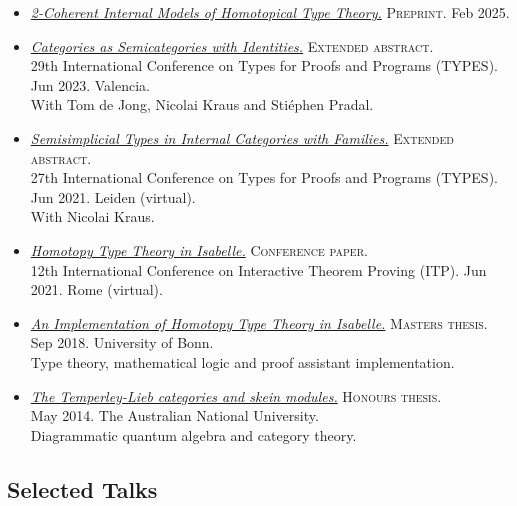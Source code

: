 \documentclass[12pt,a4paper]{article}
\begin{document}
\begin{itemize}
\item
  \href{https://joshchen.io/pdf/2-coh-internal-models.pdf}{\emph{2-Coherent Internal Models of Homotopical Type Theory.}}
  \textsc{Preprint.}
  Feb 2025.
\item
  \href{https://types2023.webs.upv.es/TYPES2023.pdf}{\emph{Categories as Semicategories with Identities.}}
  \textsc{Extended abstract.}\\
  29th International Conference on Types for Proofs and Programs (TYPES).
  Jun 2023.
  Valencia.\\
  With Tom de Jong, Nicolai Kraus and Stiéphen Pradal.
\item
  \href{https://types21.liacs.nl/download/semisimplicial-types-in-internal-categories-with-families}{\emph{Semisimplicial Types in Internal Categories with Families.}}
  \textsc{Extended abstract.}\\
  27th International Conference on Types for Proofs and Programs (TYPES).
  Jun 2021.
  Leiden (virtual).\\
  With Nicolai Kraus.
\item
  \href{https://doi.org/10.4230/LIPIcs.ITP.2021.12}{\emph{Homotopy Type Theory in Isabelle.}}
  \textsc{Conference paper.}\\
  12th International Conference on Interactive Theorem Proving (ITP).
  Jun 2021.
  Rome (virtual).
\item
  \href{https://arxiv.org/abs/1911.00399}{\emph{An Implementation of Homotopy Type Theory in Isabelle.}}
  \textsc{Masters thesis.}\\
  Sep 2018.
  University of Bonn.\\
  Type theory, mathematical logic and proof assistant implementation.
\item
  \href{https://arxiv.org/abs/1502.06845}{\emph{The Temperley-Lieb categories and skein modules.}}
  \textsc{Honours thesis.}\\
  May 2014.
  The Australian National University.\\
  Diagrammatic quantum algebra and category theory.
\end{itemize}

\subsection{Selected Talks}

\newcommand{\vid}{{\scriptsize\faVideoCamera}\hspace{0.5ex}}
\newcommand{\slides}{{\scriptsize\faDesktop}\hspace{0.5ex}}
\end{document}
